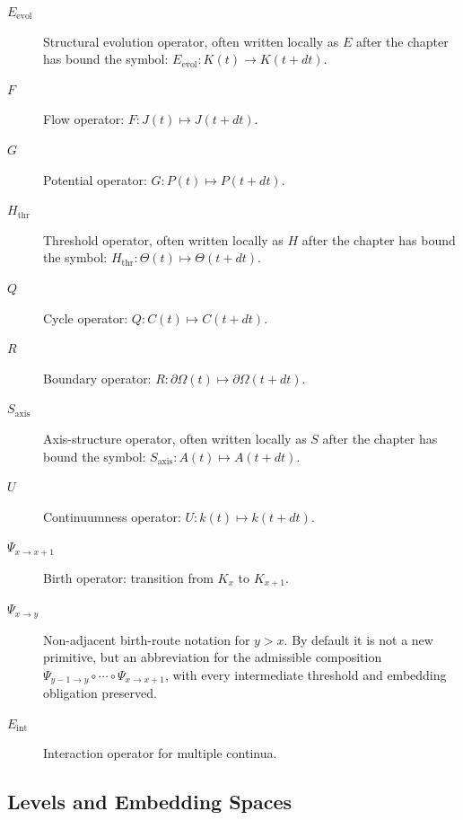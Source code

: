 \begin{description}
  \item[\(E_{\mathrm{evol}}\)] Structural evolution operator, often written
        locally as \(E\) after the chapter has bound the symbol:
        \(E_{\mathrm{evol}}: K(t) \to K(t+dt)\).
  \item[\(F\)] Flow operator:
        \(F: J(t)\mapsto J(t+dt)\).
  \item[\(G\)] Potential operator:
        \(G: P(t)\mapsto P(t+dt)\).
  \item[\(H_{\mathrm{thr}}\)] Threshold operator, often written locally as
        \(H\) after the chapter has bound the symbol:
        \(H_{\mathrm{thr}}: \Theta(t)\mapsto \Theta(t+dt)\).
  \item[\(Q\)] Cycle operator:
        \(Q: C(t)\mapsto C(t+dt)\).
  \item[\(R\)] Boundary operator:
        \(R: \partial\Omega(t)\mapsto \partial\Omega(t+dt)\).
  \item[\(S_{\mathrm{axis}}\)] Axis-structure operator, often written locally
        as \(S\) after the chapter has bound the symbol:
        \(S_{\mathrm{axis}}: A(t)\mapsto A(t+dt)\).
  \item[\(U\)] Continuumness operator:
        \(U: k(t)\mapsto k(t+dt)\).
  \item[\(\Psi_{x\to x+1}\)] Birth operator:
        transition from \(K_x\) to \(K_{x+1}\).
  \item[\(\Psi_{x\to y}\)] Non-adjacent birth-route notation for \(y>x\). By
        default it is not a new primitive, but an abbreviation for the admissible
        composition \(\Psi_{y-1\to y}\circ\cdots\circ\Psi_{x\to x+1}\), with
        every intermediate threshold and embedding obligation preserved.
  \item[\(E_{\mathrm{int}}\)] Interaction operator for multiple continua.
\end{description}

\subsection{Levels and Embedding Spaces}


